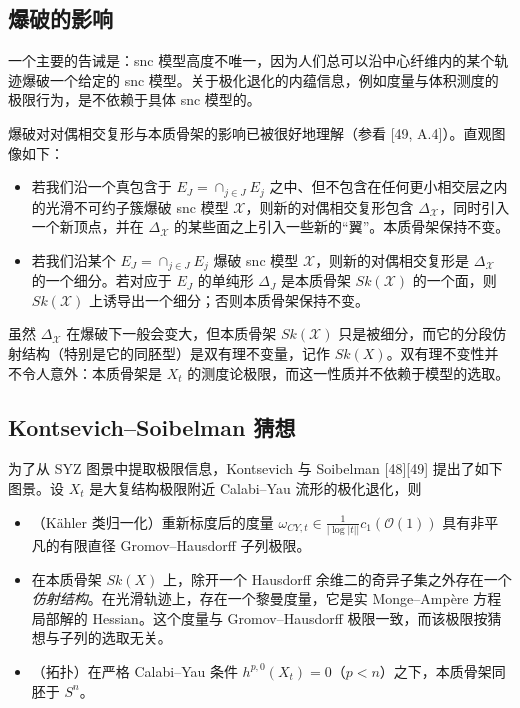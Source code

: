 \subsection{爆破的影响}

一个主要的告诫是：snc 模型高度不唯一，因为人们总可以沿中心纤维内的某个轨迹爆破一个给定的 snc 模型。关于极化退化的内蕴信息，例如度量与体积测度的极限行为，是不依赖于具体 snc 模型的。

爆破对对偶相交复形与本质骨架的影响已被很好地理解（参看 [49, A.4]）。直观图像如下：
\begin{itemize}
\item 若我们沿一个真包含于 $E_J=\cap_{j\in J}E_j$ 之中、但不包含在任何更小相交层之内的光滑不可约子簇爆破 snc 模型 $\mathcal{X}$，则新的对偶相交复形包含 $\Delta_{\mathcal{X}}$，同时引入一个新顶点，并在 $\Delta_{\mathcal{X}}$ 的某些面之上引入一些新的“翼”。本质骨架保持不变。
\item 若我们沿某个 $E_J=\cap_{j\in J}E_j$ 爆破 snc 模型 $\mathcal{X}$，则新的对偶相交复形是 $\Delta_{\mathcal{X}}$ 的一个细分。若对应于 $E_J$ 的单纯形 $\Delta_J$ 是本质骨架 $Sk(\mathcal{X})$ 的一个面，则 $Sk(\mathcal{X})$ 上诱导出一个细分；否则本质骨架保持不变。
\end{itemize}

虽然 $\Delta_{\mathcal{X}}$ 在爆破下一般会变大，但本质骨架 $Sk(\mathcal{X})$ 只是被细分，而它的分段仿射结构（特别是它的同胚型）是双有理不变量，记作 $Sk(X)$。双有理不变性并不令人意外：本质骨架是 $X_t$ 的测度论极限，而这一性质并不依赖于模型的选取。


\subsection{Kontsevich--Soibelman 猜想}

为了从 SYZ 图景中提取极限信息，Kontsevich 与 Soibelman [48][49] 提出了如下图景。设 $X_t$ 是大复结构极限附近 Calabi--Yau 流形的极化退化，则

\begin{itemize}
\item （Kähler 类归一化）重新标度后的度量 $\omega_{CY,t}\in\frac{1}{|\log|t||}c_1(\mathcal{O}(1))$ 具有非平凡的有限直径 Gromov--Hausdorff 子列极限。
\item 在本质骨架 $Sk(X)$ 上，除开一个 Hausdorff 余维二的奇异子集之外存在一个\emph{仿射结构}。在光滑轨迹上，存在一个黎曼度量，它是实 Monge--Ampère 方程局部解的 Hessian。这个度量与 Gromov--Hausdorff 极限一致，而该极限按猜想与子列的选取无关。
\item （拓扑）在严格 Calabi--Yau 条件 $h^{p,0}(X_t)=0$（$p<n$）之下，本质骨架同胚于 $S^n$。
\end{itemize}

